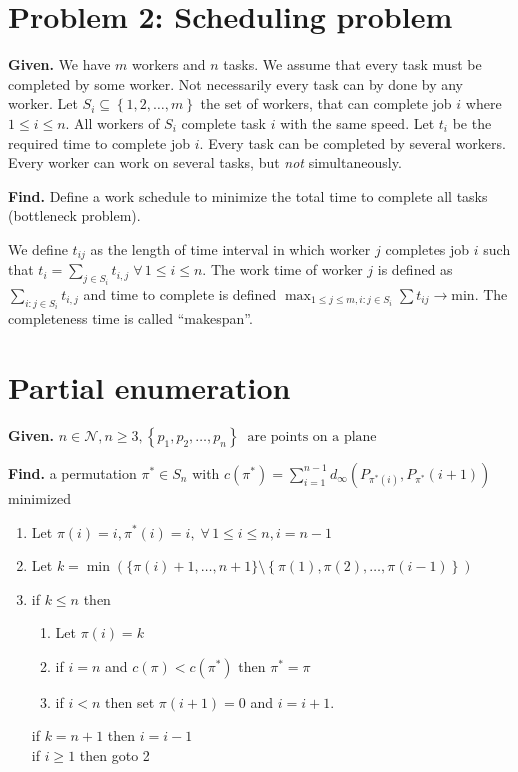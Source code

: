 \documentclass{article}
\newcommand{\set}[1]{\left\{#1\right\}}
\newcommand{\given}[1]{\textbf{Given.} #1\par}
\newcommand{\find}[1]{\textbf{Find.} #1\par}
\newcommand{\fall}{\;\forall\,}
\begin{document}
\section{Problem 2: Scheduling problem}
%
\given{We have $m$ workers and $n$ tasks. We assume that every task must be completed by some worker. Not necessarily every task can by done by any worker. Let $S_i \subseteq \set{1, 2, \ldots, m}$ the set of workers, that can complete job $i$ where $1 \leq i \leq n$. All workers of $S_i$ complete task $i$ with the same speed. Let $t_i$ be the required time to complete job $i$. Every task can be completed by several workers. Every worker can work on several tasks, but \emph{not} simultaneously.}
\find{Define a work schedule to minimize the total time to complete all tasks (bottleneck problem).}

We define $t_{ij}$ as the length of time interval in which worker $j$ completes job $i$ such that $t_i = \sum_{j \in S_i} t_{i,j} \fall 1 \leq i \leq n$. The work time of worker $j$ is defined as $\sum_{i: j \in S_i} t_{i,j}$ and time to complete is defined $\max_{1 \leq j \leq m, i: j \in S_i} \sum t_{ij} \rightarrow \text{min}$. The completeness time is called ``makespan''.

\section{Partial enumeration}
%
\given{$n \in \mathcal{N}, n \geq 3, \set{p_1, p_2, \ldots, p_n}\ \text{ are points on a plane}$}
\find{a permutation $\pi^* \in S_n$ with $c(\pi^*) = \sum_{i=1}^{n-1} d_\infty(P_{\pi^*(i)}, P_{\pi^*}(i+1))$ minimized}

\begin{enumerate}
  \item Let $\pi(i) = i, \pi^*(i) = i, \fall 1 \leq i \leq n, i = n - 1$
  \item Let $k = \min(\{\pi(i) + 1, \ldots, n+1\} \setminus \set{\pi(1), \pi(2), \ldots, \pi(i-1)})$
  \item if $k \leq n$ then
    \begin{enumerate}
      \item Let $\pi(i) = k$
      \item if $i = n$ and $c(\pi) < c(\pi^*)$ then $\pi^* = \pi$
      \item if $i < n$ then set $\pi(i+1) = 0$ and $i = i + 1$.
    \end{enumerate}
    if $k = n + 1$ then $i = i - 1$ \\
    if $i \geq 1$ then goto 2
\end{enumerate}
\end{document}
